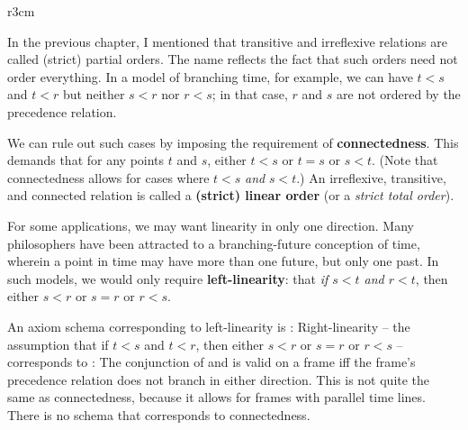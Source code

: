 \begin{wrapfigure}{r}{3cm}
  \quad
\end{wrapfigure}
In the previous chapter, I mentioned that transitive and irreflexive relations
are called (strict) partial orders. The name reflects the fact that such orders
need not order everything. In a model of branching time, for example, we can
have $t<s$ and $t<r$ but neither $s<r$ nor $r<s$; in that case, $r$ and $s$ are
not ordered by the precedence relation.

We can rule out such cases by imposing the requirement of
\textbf{connectedness}. This demands that for any points $t$ and $s$, either
$t < s$ or $t=s$ or $s < t$. (Note that connectedness allows for cases where
$t<s$ \emph{and} $s<t$.) An irreflexive, transitive, and connected relation is
called a \textbf{(strict) linear order} (or a \emph{strict total order}).

For some applications, we may want linearity in only one direction. Many
philosophers have been attracted to a branching-future conception of time,
wherein a point in time may have more than one future, but only one past. In
such models, we would only require \textbf{left-linearity}: that \emph{if
  $s < t$ and $r < t$}, then either $s < r$ or $s=r$ or $r < s$.

An axiom schema corresponding to left-linearity is :
%
%
Right-linearity -- the assumption that if $t < s$ and $t < r$, then either
$s < r$ or $s=r$ or $r < s$ -- corresponds to :
%
%
%
The conjunction of  and  is valid on a frame iff the frame's
precedence relation does not branch in either direction. This is not quite the
same as connectedness, because it allows for frames with parallel time lines.
There is no schema that corresponds to connectedness.

